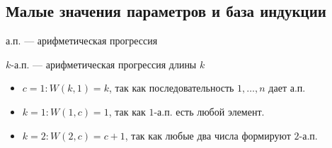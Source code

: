 \begin{normalsize}

\subsection{Малые значения параметров и база индукции}

\begin{notice}
    а.п. --- арифметическая прогрессия

    $k$-а.п. --- арифметическая прогрессия длины $k$
\end{notice}

\begin{itemize}
    \item $c = 1: W(k, 1) = k$, так как последовательность $1, \ldots, n$ дает а.п.
    
    \item $k = 1: W(1, c) = 1$, так как $1$-а.п. есть любой элемент.
    
    \item $k = 2: W(2, c) = c + 1$, так как любые два числа формируют $2$-а.п.
\end{itemize}

\end{normalsize}